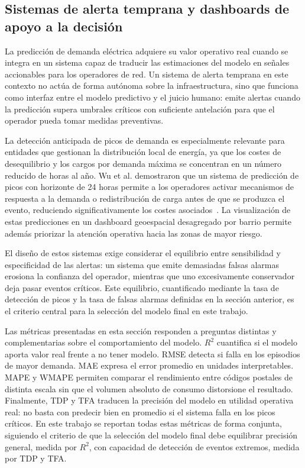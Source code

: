 \documentclass[12pt, a4paper]{article}
\begin{document}
\subsection{Sistemas de alerta temprana y dashboards de apoyo a la decisión}

La predicción de demanda eléctrica adquiere su valor operativo real cuando se integra en un sistema capaz de traducir las estimaciones del modelo en señales accionables para los operadores de red. Un sistema de alerta temprana en este contexto no actúa de forma autónoma sobre la infraestructura, sino que funciona como interfaz entre el modelo predictivo y el juicio humano: emite alertas cuando la predicción supera umbrales críticos con suficiente antelación para que el operador pueda tomar medidas preventivas.

La detección anticipada de picos de demanda es especialmente relevante para entidades que gestionan la distribución local de energía, ya que los costes de desequilibrio y los cargos por demanda máxima se concentran en un número reducido de horas al año. Wu et al. demostraron que un sistema de predicción de picos con horizonte de 24 horas permite a los operadores activar mecanismos de respuesta a la demanda o redistribución de carga antes de que se produzca el evento, reduciendo significativamente los costes asociados~\cite{wu2022}. La visualización de estas predicciones en un dashboard geoespacial desagregado por barrio permite además priorizar la atención operativa hacia las zonas de mayor riesgo.

El diseño de estos sistemas exige considerar el equilibrio entre sensibilidad y especificidad de las alertas: un sistema que emite demasiadas falsas alarmas erosiona la confianza del operador, mientras que uno excesivamente conservador deja pasar eventos críticos. Este equilibrio, cuantificado mediante la tasa de detección de picos y la tasa de falsas alarmas definidas en la sección anterior, es el criterio central para la selección del modelo final en este trabajo.

Las métricas presentadas en esta sección responden a preguntas distintas y complementarias sobre el comportamiento del modelo. $R^2$ cuantifica si el modelo aporta valor real frente a no tener modelo. RMSE detecta si falla en los episodios de mayor demanda. MAE expresa el error promedio en unidades interpretables. MAPE y WMAPE permiten comparar el rendimiento entre códigos postales de distinta escala sin que el volumen absoluto de consumo distorsione el resultado. Finalmente, TDP y TFA traducen la precisión del modelo en utilidad operativa real: no basta con predecir bien en promedio si el sistema falla en los picos críticos. En este trabajo se reportan todas estas métricas de forma conjunta, siguiendo el criterio de que la selección del modelo final debe equilibrar precisión general, medida por $R^2$, con capacidad de detección de eventos extremos, medida por TDP y TFA.
\end{document}
